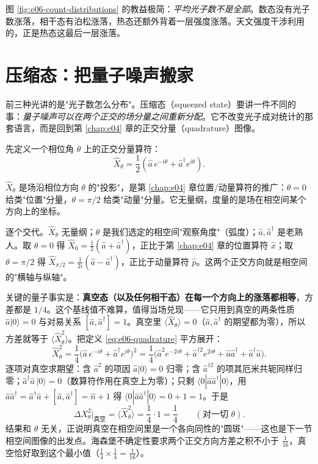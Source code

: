 图 \ref{fig:e06-count-distributions} 的教益极简：\emph{平均光子数不是全部}。数态没有光子数涨落，相干态有泊松涨落，热态还额外背着一层强度涨落。天文强度干涉利用的，正是热态这最后一层涨落。

\section{压缩态：把量子噪声搬家}
\label{sec:e06-squeezed}

前三种光讲的是"光子数怎么分布"。压缩态（squeezed state）要讲一件不同的事：\emph{量子噪声可以在两个正交的场分量之间重新分配}。它不改变光子成对统计的那套语言，而是回到第 \ref{chap:e04} 章的正交分量（quadrature）图像。

先定义一个相位角 \(\theta\) 上的正交分量算符：
\begin{equation}
  \hat X_\theta=\frac{1}{2}\left(\hat a\,e^{-i\theta}+\hat a^{\dagger}e^{i\theta}\right).
  \label{eq:e06-quadrature}
\end{equation}
\begin{formulaexplain}
\(\hat X_\theta\) 是场沿相位方向 \(\theta\) 的"投影"，是第 \ref{chap:e04} 章位置/动量算符的推广：\(\theta=0\) 给类"位置"分量，\(\theta=\pi/2\) 给类"动量"分量。它无量纲，度量的是场在相空间某个方向上的坐标。
\end{formulaexplain}

逐个交代。\(\hat X_\theta\) 无量纲；\(\theta\) 是我们选定的相空间"观察角度"（弧度）；\(\hat a,\hat a^\dagger\) 是老熟人。取 \(\theta=0\) 得 \(\hat X_0=\tfrac12(\hat a+\hat a^\dagger)\)，正比于第 \ref{chap:e04} 章的位置算符 \(\hat x\)；取 \(\theta=\pi/2\) 得 \(\hat X_{\pi/2}=\tfrac{1}{2i}(\hat a-\hat a^\dagger)\)，正比于动量算符 \(\hat p\)。这两个正交方向就是相空间的"横轴与纵轴"。

关键的量子事实是：\textbf{真空态（以及任何相干态）在每一个方向上的涨落都相等}，方差都是 \(1/4\)。这个基线值不难算，值得当场兑现——它只用到真空的两条性质 \(\hat a|0\rangle=0\) 与对易关系 \([\hat a,\hat a^\dagger]=1\)。真空里 \(\langle\hat X_\theta\rangle=0\)（\(\hat a,\hat a^\dagger\) 的期望都为零），所以方差就等于 \(\langle\hat X_\theta^2\rangle\)。把定义 \eqref{eq:e06-quadrature} 平方展开：
\[
  \hat X_\theta^{2}
  =\frac14\big(\hat a\,e^{-i\theta}+\hat a^\dagger e^{i\theta}\big)^2
  =\frac14\big(\hat a^2 e^{-2i\theta}+\hat a^{\dagger 2}e^{2i\theta}
     +\hat a\hat a^\dagger+\hat a^\dagger\hat a\big).
\]
逐项对真空求期望：含 \(\hat a^2\) 的项因 \(\hat a|0\rangle=0\) 归零；含 \(\hat a^{\dagger2}\) 的项其厄米共轭同样归零；\(\hat a^\dagger\hat a\,|0\rangle=0\)（数算符作用在真空上为零）；只剩 \(\langle 0|\hat a\hat a^\dagger|0\rangle\)，用 \(\hat a\hat a^\dagger=\hat a^\dagger\hat a+[\hat a,\hat a^\dagger]=\hat n+1\) 得 \(\langle0|\hat a\hat a^\dagger|0\rangle=0+1=1\)。于是
\[
  \Delta X_\theta^{2}\big|_{\text{真空}}=\langle\hat X_\theta^2\rangle
  =\frac14\cdot 1=\frac{1}{4}\qquad(\text{对一切 }\theta).
\]
结果和 \(\theta\) 无关，正说明真空在相空间里是一个各向同性的"圆斑"——这也是下一节相空间图像的出发点。海森堡不确定性要求两个正交方向方差之积不小于 \(\tfrac{1}{16}\)，真空恰好取到这个最小值（\(\tfrac14\times\tfrac14=\tfrac1{16}\)）。

